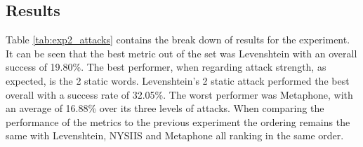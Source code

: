 \subsection*{Results}
Table \ref{tab:exp2_attacks} contains the break down of results for the experiment. It can be seen that the best metric out of the set was Levenshtein with an overall success of 19.80\%. The best performer, when regarding attack strength, as expected, is the 2 static words. Levenshtein's 2 static attack performed the best overall with a success rate of 32.05\%. The worst performer was Metaphone, with an average of 16.88\% over its three levels of attacks. When comparing the performance of the metrics to the previous experiment the ordering remains the same with Levenshtein, NYSIIS and Metaphone all ranking in the same order.

\begin{table}
    \caption{Success rates for simulated attacks}
    \label{tab:exp2_attacks}
\end{table}


